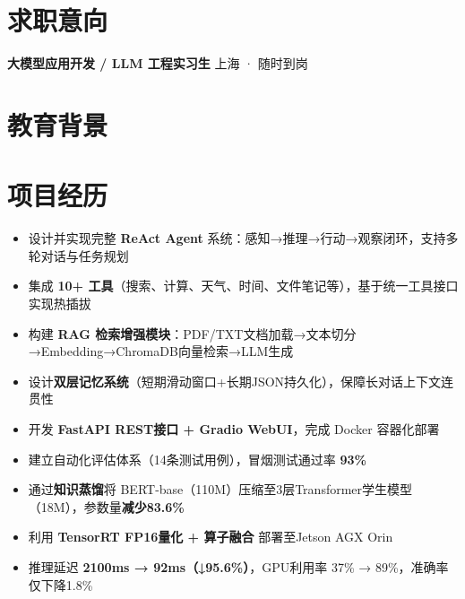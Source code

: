\documentclass{resume}
\begin{document}

\section{求职意向}
\vspace{-4pt}
\textbf{大模型应用开发 / LLM 工程实习生} \hfill 上海 · 随时到岗

\section{教育背景}

\section{项目经历}
\begin{itemize}
  \item 设计并实现完整 \textbf{ReAct Agent} 系统：感知→推理→行动→观察闭环，支持多轮对话与任务规划
  \item 集成 \textbf{10+ 工具}（搜索、计算、天气、时间、文件笔记等），基于统一工具接口实现热插拔
  \item 构建 \textbf{RAG 检索增强模块}：PDF/TXT文档加载→文本切分→Embedding→ChromaDB向量检索→LLM生成
  \item 设计\textbf{双层记忆系统}（短期滑动窗口+长期JSON持久化），保障长对话上下文连贯性
  \item 开发 \textbf{FastAPI REST接口 + Gradio WebUI}，完成 Docker 容器化部署
  \item 建立自动化评估体系（14条测试用例），冒烟测试通过率 \textbf{93\%}
\end{itemize}

\begin{itemize}
  \item 通过\textbf{知识蒸馏}将 BERT-base（110M）压缩至3层Transformer学生模型（18M），参数量\textbf{减少83.6\%}
  \item 利用 \textbf{TensorRT FP16量化 + 算子融合} 部署至Jetson AGX Orin
  \item 推理延迟 \textbf{2100ms → 92ms（↓95.6\%）}，GPU利用率 37\% → 89\%，准确率仅下降1.8\%
\end{itemize}
\end{document}
